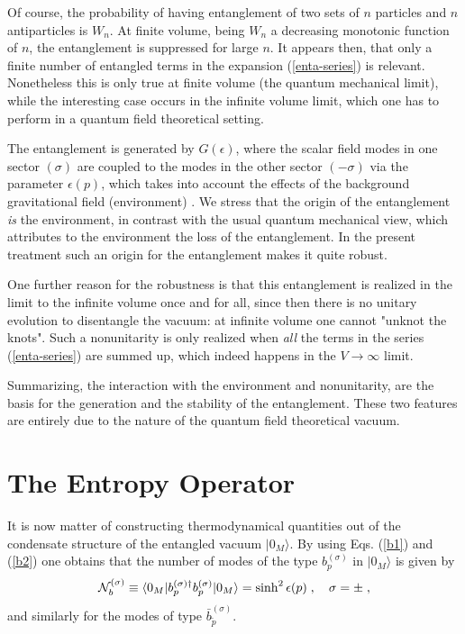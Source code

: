 \noindent Of course, the probability of having entanglement of two
sets of $n$ particles and $n$ antiparticles is $W_n$. At finite
volume, being $W_n$ a decreasing monotonic function of $n$, the
entanglement is suppressed for large $n$. It appears then, that
only a finite number of entangled terms in the expansion
(\ref{enta-series}) is relevant. Nonetheless this is only true at
finite volume (the quantum mechanical limit), while the
interesting case occurs in the infinite volume limit, which one
has to perform in a quantum field theoretical setting.

\noindent The entanglement is generated by $G(\epsilon)$, where
the scalar field modes in one sector $(\sigma)$ are coupled to the
modes in the other sector $(-\sigma)$ via the parameter
$\epsilon(p)$, which takes into account the effects of the
background gravitational field (environment) \cite{Iorio:2001te}.
We stress that the origin of the entanglement {\it is} the
environment, in contrast with the usual quantum mechanical view,
which attributes to the environment the loss of the entanglement.
In the present treatment such an origin for the entanglement makes
it quite robust.

\noindent One further reason for the robustness is that this
entanglement is realized in the limit to the infinite volume once
and for all, since then there is no unitary evolution to
disentangle the vacuum: at infinite volume one cannot "unknot the
knots". Such a nonunitarity is only realized when {\it all} the
terms in the series (\ref{enta-series}) are summed up, which
indeed happens in the $V\to \infty$ limit.

\noindent Summarizing, the interaction with the environment and
nonunitarity, are the basis for the generation and the stability
of the entanglement. These two features are entirely due to the
nature of the quantum field theoretical vacuum.

\section{The Entropy Operator}
\setcounter{equation}{0}

\noindent It is now matter of constructing thermodynamical
quantities out of the condensate structure of the entangled vacuum
$|0_M \rangle$. By using Eqs. (\ref{b1}) and (\ref{b2}) one
obtains that the number of modes of the type $b_p^{(\sigma)}$ in
$|0_M\rangle$ is given by
 \begin{equation}\label{25}
 {\cal N}^{(\sigma)}_{b} \equiv \langle 0_M|b_p^{(\sigma)
 \dagger} b_p^{(\sigma)}|0_M\rangle =
 \sinh^2\epsilon(p) \;, \quad \sigma = \pm \;,
 \end{equation}
and similarly for the modes of type $\bar{b}_{\tilde
p}^{(\sigma)}$.

